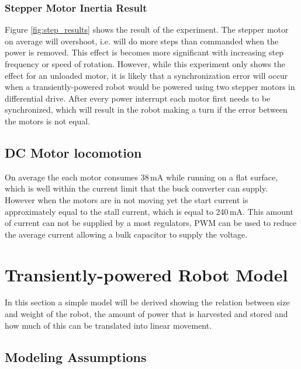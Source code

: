 \subsubsection{Stepper Motor Inertia Result}

Figure \ref{fig:step_results} shows the result of the experiment.
The stepper motor on average will overshoot, i.e. will do more steps than commanded when the power is removed.
This effect is becomes more significant with increasing step frequency or speed of rotation.
However, while this experiment only shows the effect for an unloaded motor, it is likely that a synchronization error will occur when a transiently-powered robot would be powered using two stepper motors in differential drive.
After every power interrupt each motor first needs to be synchronized, which will result in the robot making a turn if the error between the motors is not equal.


\subsection{DC Motor locomotion}




On average the each motor consumes 38\,mA while running on a flat surface, which is well within the current limit that the buck converter can supply.
However when the motors are in not moving yet the start current is approximately equal to the stall current, which is equal to 240\,mA.
This amount of current can not be supplied by a most regulators, PWM can be used to reduce the average current allowing a bulk capacitor to supply the voltage.


\section{Transiently-powered Robot Model}
\label{sec:transient_model}

In this section a simple model will be derived showing the relation between size and weight of the robot, the amount of power that is harvested and stored and how much of this can be translated into linear movement.

\subsection{Modeling Assumptions}


